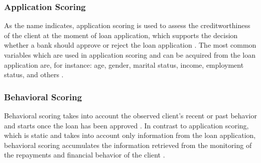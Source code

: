 \subsubsection{Application Scoring}
As the name indicates, application scoring is used to assess the creditworthiness of the client at the moment of loan application, which supports the decision whether a bank should approve or reject the loan application \citep{baesens2016credit}. The most common variables which are used in application scoring and can be acquired from the loan application are, for instance: age, gender, marital status, income, employment status, and others \citep{baesens2016credit}.
\subsubsection{Behavioral Scoring}
Behavioral scoring takes into account the observed client's recent or past behavior and starts once the loan has been approved \citep{van2009credit}. In contrast to application scoring, which is static and takes into account only information from the loan application, behavioral scoring accumulates the information retrieved from the monitoring of the repayments and financial behavior of the client \citep{van2009credit}.



\newpage
